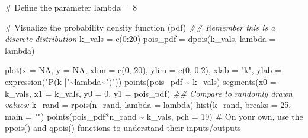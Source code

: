 \documentclass[
  letterpaper,
  DIV=11,
  numbers=noendperiod]{scrreprt}
\newenvironment{Shaded}{\begin{snugshade}}{\end{snugshade}}
\newcommand{\AttributeTok}[1]{\textcolor[rgb]{0.40,0.45,0.13}{#1}}
\newcommand{\CommentTok}[1]{\textcolor[rgb]{0.37,0.37,0.37}{#1}}
\newcommand{\ConstantTok}[1]{\textcolor[rgb]{0.56,0.35,0.01}{#1}}
\newcommand{\DecValTok}[1]{\textcolor[rgb]{0.68,0.00,0.00}{#1}}
\newcommand{\DocumentationTok}[1]{\textcolor[rgb]{0.37,0.37,0.37}{\textit{#1}}}
\newcommand{\FloatTok}[1]{\textcolor[rgb]{0.68,0.00,0.00}{#1}}
\newcommand{\FunctionTok}[1]{\textcolor[rgb]{0.28,0.35,0.67}{#1}}
\newcommand{\NormalTok}[1]{\textcolor[rgb]{0.00,0.23,0.31}{#1}}
\newcommand{\OtherTok}[1]{\textcolor[rgb]{0.00,0.23,0.31}{#1}}
\newcommand{\SpecialCharTok}[1]{\textcolor[rgb]{0.37,0.37,0.37}{#1}}
\newcommand{\StringTok}[1]{\textcolor[rgb]{0.13,0.47,0.30}{#1}}
\begin{document}
\begin{Shaded}
\begin{Highlighting}[]
\CommentTok{\# Define the parameter}
\NormalTok{lambda }\OtherTok{=} \DecValTok{8}

\CommentTok{\# Visualize the probability density function (pdf)}
\DocumentationTok{\#\# Remember this is a discrete distribution}
\NormalTok{k\_vals }\OtherTok{=} \FunctionTok{c}\NormalTok{(}\DecValTok{0}\SpecialCharTok{:}\DecValTok{20}\NormalTok{)}
\NormalTok{pois\_pdf }\OtherTok{=} \FunctionTok{dpois}\NormalTok{(k\_vals, }\AttributeTok{lambda =}\NormalTok{ lambda)}

\FunctionTok{plot}\NormalTok{(}\AttributeTok{x =} \ConstantTok{NA}\NormalTok{, }\AttributeTok{y =} \ConstantTok{NA}\NormalTok{, }\AttributeTok{xlim =} \FunctionTok{c}\NormalTok{(}\DecValTok{0}\NormalTok{, }\DecValTok{20}\NormalTok{), }\AttributeTok{ylim =} \FunctionTok{c}\NormalTok{(}\DecValTok{0}\NormalTok{, }\FloatTok{0.2}\NormalTok{),}
     \AttributeTok{xlab =} \StringTok{"k"}\NormalTok{, }\AttributeTok{ylab =} \FunctionTok{expression}\NormalTok{(}\StringTok{"P(k |"}\SpecialCharTok{\textasciitilde{}}\NormalTok{lambda}\SpecialCharTok{\textasciitilde{}}\StringTok{")"}\NormalTok{))}
\FunctionTok{points}\NormalTok{(pois\_pdf }\SpecialCharTok{\textasciitilde{}}\NormalTok{ k\_vals)}
\FunctionTok{segments}\NormalTok{(}\AttributeTok{x0 =}\NormalTok{ k\_vals, }\AttributeTok{x1 =}\NormalTok{ k\_vals,}
         \AttributeTok{y0 =} \DecValTok{0}\NormalTok{, }\AttributeTok{y1 =}\NormalTok{ pois\_pdf)}
\DocumentationTok{\#\# Compare to randomly drawn values:}
\NormalTok{k\_rand }\OtherTok{=} \FunctionTok{rpois}\NormalTok{(n\_rand, }\AttributeTok{lambda =}\NormalTok{ lambda)}
\FunctionTok{hist}\NormalTok{(k\_rand, }\AttributeTok{breaks =} \DecValTok{25}\NormalTok{, }\AttributeTok{main =} \StringTok{""}\NormalTok{)}
\FunctionTok{points}\NormalTok{(pois\_pdf}\SpecialCharTok{*}\NormalTok{n\_rand }\SpecialCharTok{\textasciitilde{}}\NormalTok{ k\_vals, }\AttributeTok{pch =} \DecValTok{19}\NormalTok{)}
\CommentTok{\# On your own, use the ppois() and qpois() functions to understand their inputs/outputs}
\end{Highlighting}
\end{Shaded}
\end{document}
